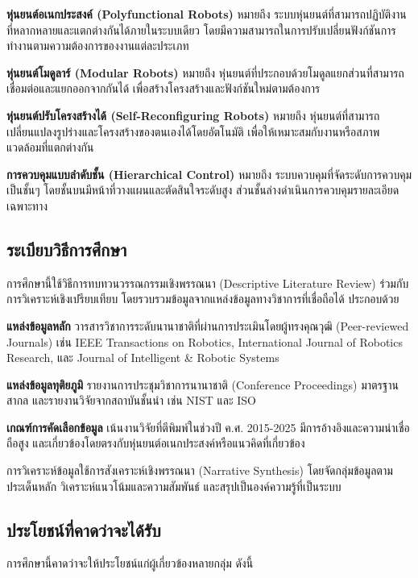 \documentclass[a4paper]{article}
\begin{document}
\textbf{หุ่นยนต์อเนกประสงค์ (Polyfunctional Robots)} หมายถึง ระบบหุ่นยนต์ที่สามารถปฏิบัติงานที่หลากหลายและแตกต่างกันได้ภายในระบบเดียว โดยมีความสามารถในการปรับเปลี่ยนฟังก์ชันการทำงานตามความต้องการของงานแต่ละประเภท

\textbf{หุ่นยนต์โมดูลาร์ (Modular Robots)} หมายถึง หุ่นยนต์ที่ประกอบด้วยโมดูลแยกส่วนที่สามารถเชื่อมต่อและแยกออกจากกันได้ เพื่อสร้างโครงสร้างและฟังก์ชันใหม่ตามต้องการ \parencite{bi2016survey}

\textbf{หุ่นยนต์ปรับโครงสร้างได้ (Self-Reconfiguring Robots)} หมายถึง หุ่นยนต์ที่สามารถเปลี่ยนแปลงรูปร่างและโครงสร้างของตนเองได้โดยอัตโนมัติ เพื่อให้เหมาะสมกับงานหรือสภาพแวดล้อมที่แตกต่างกัน \parencite{hameed2017modular}

\textbf{การควบคุมแบบลำดับชั้น (Hierarchical Control)} หมายถึง ระบบควบคุมที่จัดระดับการควบคุมเป็นชั้นๆ โดยชั้นบนมีหน้าที่วางแผนและตัดสินใจระดับสูง ส่วนชั้นล่างดำเนินการควบคุมรายละเอียดเฉพาะทาง

\subsection{ระเบียบวิธีการศึกษา}

การศึกษานี้ใช้วิธีการทบทวนวรรณกรรมเชิงพรรณนา (Descriptive Literature Review) ร่วมกับการวิเคราะห์เชิงเปรียบเทียบ โดยรวบรวมข้อมูลจากแหล่งข้อมูลทางวิชาการที่เชื่อถือได้ ประกอบด้วย

\textbf{แหล่งข้อมูลหลัก} วารสารวิชาการระดับนานาชาติที่ผ่านการประเมินโดยผู้ทรงคุณวุฒิ (Peer-reviewed Journals) เช่น IEEE Transactions on Robotics, International Journal of Robotics Research, และ Journal of Intelligent \& Robotic Systems

\textbf{แหล่งข้อมูลทุติยภูมิ} รายงานการประชุมวิชาการนานาชาติ (Conference Proceedings) มาตรฐานสากล และรายงานวิจัยจากสถาบันชั้นนำ เช่น NIST และ ISO

\textbf{เกณฑ์การคัดเลือกข้อมูล} เน้นงานวิจัยที่ตีพิมพ์ในช่วงปี ค.ศ. 2015-2025 มีการอ้างอิงและความน่าเชื่อถือสูง และเกี่ยวข้องโดยตรงกับหุ่นยนต์อเนกประสงค์หรือแนวคิดที่เกี่ยวข้อง

การวิเคราะห์ข้อมูลใช้การสังเคราะห์เชิงพรรณนา (Narrative Synthesis) โดยจัดกลุ่มข้อมูลตามประเด็นหลัก วิเคราะห์แนวโน้มและความสัมพันธ์ และสรุปเป็นองค์ความรู้ที่เป็นระบบ

\subsection{ประโยชน์ที่คาดว่าจะได้รับ}

การศึกษานี้คาดว่าจะให้ประโยชน์แก่ผู้เกี่ยวข้องหลายกลุ่ม ดังนี้
\end{document}
